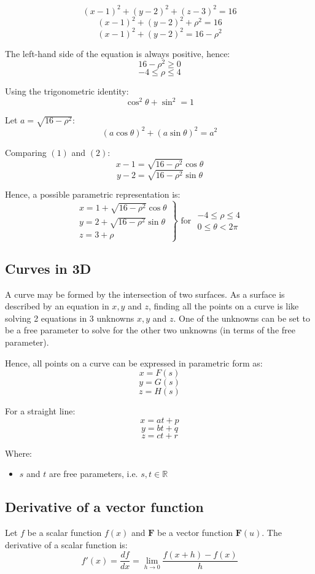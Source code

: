 \documentclass[11pt]{article}
\begin{document}
\[(x - 1)^2 + (y - 2)^2 + (z - 3)^2 = 16\]
\[(x - 1)^2 + (y - 2)^2 + \rho^2 = 16\]
\[(x - 1)^2 + (y - 2)^2 = 16 - \rho^2 \tag{1}\]

The left-hand side of the equation is always positive, hence:
\[16 - \rho^2 \ge 0\]
\[-4 \le \rho \le 4\]

Using the trigonometric identity:
\[\cos^2 \theta + \sin^2 = 1\]

Let \(a = \sqrt{16 - \rho^2}\):
\[(a \cos \theta)^2 + (a \sin \theta)^2 = a^2 \tag{2}\]

Comparing \((1)\) and \((2)\):
\[x - 1 = \sqrt{16 - \rho^2} \cos \theta\]
\[y - 2 = \sqrt{16 - \rho^2} \sin \theta\]

Hence, a possible parametric representation is:
\begin{displaymath}
\left. \begin{array}{l}
x = 1 + \sqrt{16 - \rho^2} \cos \theta \\
y = 2 + \sqrt{16 - \rho^2} \sin \theta \\
z = 3 + \rho
\end{array} \right\} \text{ for } \begin{array}{c}
-4 \le \rho \le 4 \\
0 \le \theta < 2 \pi
\end{array}
\end{displaymath}
\subsection{Curves in 3D}
\label{sec:org111d0f2}
A curve may be formed by the intersection of two surfaces.
As a surface is described by an equation in \(x, y\) and \(z\), finding all the points on a curve is like solving 2 equations in 3 unknowns \(x, y\) and \(z\).
One of the unknowns can be set to be a free parameter to solve for the other two unknowns (in terms of the free parameter).

Hence, all points on a curve can be expressed in parametric form as:
\[x = F(s)\]
\[y = G(s)\]
\[z = H(s)\]

For a straight line:
\[x = at + p\]
\[y = bt + q\]
\[z = ct + r\]

Where:
\begin{itemize}
\item \(s\) and \(t\) are free parameters, i.e. \(s, t \in \mathbb{R}\)
\end{itemize}
\subsection{Derivative of a vector function}
\label{sec:orgf29d92e}
Let \(f\) be a scalar function \(f(x)\) and \(\boldsymbol{F}\) be a vector function \(\boldsymbol{F}(u)\). The derivative of a scalar function is:
\[f'(x) = \frac{df}{dx} = \lim_{h \rightarrow 0} \frac{f(x + h) - f(x)}{h}\]
\end{document}
